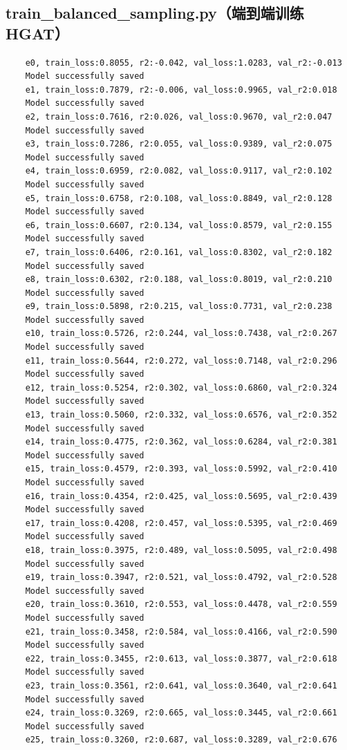\documentclass[a4paper, 12pt]{article}
\begin{document}
	\subsection{train\_balanced\_sampling.py（端到端训练HGAT）}	
	\begin{lstlisting}
	e0, train_loss:0.8055, r2:-0.042, val_loss:1.0283, val_r2:-0.013
	Model successfully saved
	e1, train_loss:0.7879, r2:-0.006, val_loss:0.9965, val_r2:0.018
	Model successfully saved
	e2, train_loss:0.7616, r2:0.026, val_loss:0.9670, val_r2:0.047
	Model successfully saved
	e3, train_loss:0.7286, r2:0.055, val_loss:0.9389, val_r2:0.075
	Model successfully saved
	e4, train_loss:0.6959, r2:0.082, val_loss:0.9117, val_r2:0.102
	Model successfully saved
	e5, train_loss:0.6758, r2:0.108, val_loss:0.8849, val_r2:0.128
	Model successfully saved
	e6, train_loss:0.6607, r2:0.134, val_loss:0.8579, val_r2:0.155
	Model successfully saved
	e7, train_loss:0.6406, r2:0.161, val_loss:0.8302, val_r2:0.182
	Model successfully saved
	e8, train_loss:0.6302, r2:0.188, val_loss:0.8019, val_r2:0.210
	Model successfully saved
	e9, train_loss:0.5898, r2:0.215, val_loss:0.7731, val_r2:0.238
	Model successfully saved
	e10, train_loss:0.5726, r2:0.244, val_loss:0.7438, val_r2:0.267
	Model successfully saved
	e11, train_loss:0.5644, r2:0.272, val_loss:0.7148, val_r2:0.296
	Model successfully saved
	e12, train_loss:0.5254, r2:0.302, val_loss:0.6860, val_r2:0.324
	Model successfully saved
	e13, train_loss:0.5060, r2:0.332, val_loss:0.6576, val_r2:0.352
	Model successfully saved
	e14, train_loss:0.4775, r2:0.362, val_loss:0.6284, val_r2:0.381
	Model successfully saved
	e15, train_loss:0.4579, r2:0.393, val_loss:0.5992, val_r2:0.410
	Model successfully saved
	e16, train_loss:0.4354, r2:0.425, val_loss:0.5695, val_r2:0.439
	Model successfully saved
	e17, train_loss:0.4208, r2:0.457, val_loss:0.5395, val_r2:0.469
	Model successfully saved
	e18, train_loss:0.3975, r2:0.489, val_loss:0.5095, val_r2:0.498
	Model successfully saved
	e19, train_loss:0.3947, r2:0.521, val_loss:0.4792, val_r2:0.528
	Model successfully saved
	e20, train_loss:0.3610, r2:0.553, val_loss:0.4478, val_r2:0.559
	Model successfully saved
	e21, train_loss:0.3458, r2:0.584, val_loss:0.4166, val_r2:0.590
	Model successfully saved
	e22, train_loss:0.3455, r2:0.613, val_loss:0.3877, val_r2:0.618
	Model successfully saved
	e23, train_loss:0.3561, r2:0.641, val_loss:0.3640, val_r2:0.641
	Model successfully saved
	e24, train_loss:0.3269, r2:0.665, val_loss:0.3445, val_r2:0.661
	Model successfully saved
	e25, train_loss:0.3260, r2:0.687, val_loss:0.3289, val_r2:0.676

\end{lstlisting}
\end{document}
